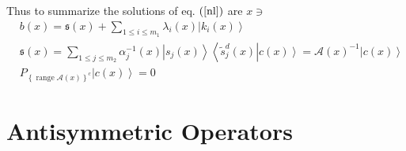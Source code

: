 \documentclass[aps,preprint]{revtex4}%
\begin{document}
Thus to summarize the solutions of eq. $\left(  \ref{nl}\right)  $ are $x\ni$
\begin{align}
& b\left(  x\right)  =\mathfrak{s}\left(  x\right)  +\sum_{1\leq i\leq m_{1}%
}\lambda_{i}\left(  x\right)  \left|  k_{i}\left(  x\right)  \right\rangle
\nonumber\\
& \mathfrak{s}\left(  x\right)  =\sum_{1\leq j\leq m_{2}}\alpha_{j}%
^{-1}\left(  x\right)  \left|  s_{j}\left(  x\right)  \right\rangle
\left\langle \tilde{s}_{j}^{d}\left(  x\right)  \right|  \left.  c\left(
x\right)  \right\rangle =\mathcal{A}\left(  x\right)  ^{-1}\left|  c\left(
x\right)  \right\rangle \nonumber\\
& P_{\left\{  \operatorname{range}\mathcal{A}\left(  x\right)  \right\}  ^{c}%
}\left|  c\left(  x\right)  \right\rangle =0
\end{align}


\section{Antisymmetric Operators}
\end{document}
